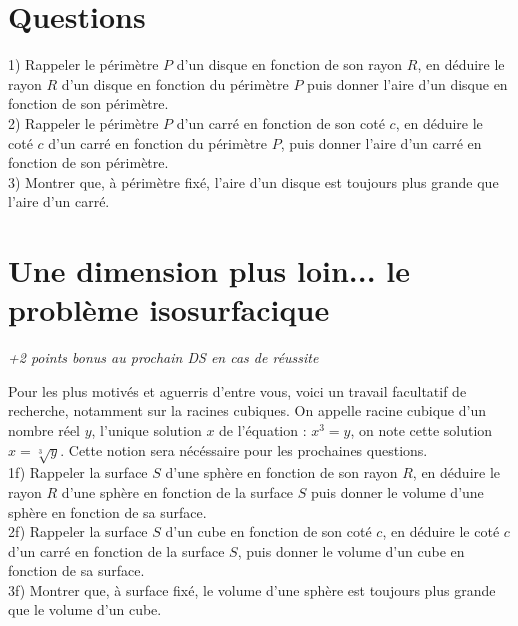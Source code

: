 \documentclass[french]{book}
\begin{document}
\section*{Questions}

1) Rappeler le périmètre $P$ d'un disque en fonction de son  rayon $R$, en déduire le rayon $R$ d'un disque en fonction du périmètre $P$ puis donner l'aire d'un disque en fonction de son périmètre. \\

2) Rappeler le périmètre $P$ d'un carré en fonction de son coté $c$, en déduire le coté $c$ d'un carré en fonction du périmètre $P$, puis donner l'aire d'un carré en fonction de son périmètre. \\

3) Montrer que, à périmètre fixé, l'aire d'un disque est toujours plus grande que l'aire d'un carré.

\section*{Une dimension plus loin... le problème isosurfacique}


\begin{center}
\textit{+2 points bonus au prochain DS en cas de réussite}
\end{center}

Pour les plus motivés et aguerris d'entre vous, voici un travail facultatif de recherche, notamment sur la racines cubiques. On appelle racine cubique d'un nombre réel $y$, l'unique solution $x$ de l'équation : $x^{3}=y$, on note cette solution $x={\sqrt[ 3]{y}}$. Cette notion sera nécéssaire pour les prochaines questions.\\

1f) Rappeler la surface $S$ d'une sphère en fonction de son rayon $R$, en déduire le rayon $R$ d'une sphère en fonction de la surface $S$ puis donner le volume d'une sphère en fonction de sa surface. \\

2f) Rappeler la surface $S$ d'un cube en fonction de son coté $c$, en déduire le coté $c$ d'un carré en fonction de la surface $S$, puis donner le volume d'un cube en fonction de sa surface. \\

3f) Montrer que, à surface fixé, le volume d'une sphère est toujours plus grande que le volume d'un cube.\\
\end{document}
